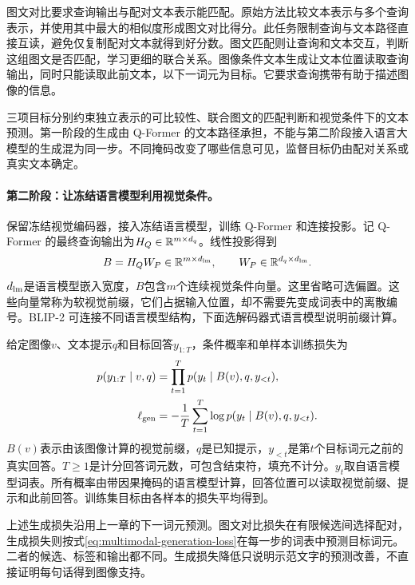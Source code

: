 图文对比要求查询输出与配对文本表示能匹配。原始方法比较文本表示与多个查询表示，并使用其中最大的相似度形成图文对比得分。此任务限制查询与文本路径直接互读，避免仅复制配对文本就得到好分数。图文匹配则让查询和文本交互，判断这组图文是否匹配，学习更细的联合关系。图像条件文本生成让文本位置读取查询输出，同时只能读取此前文本，以下一词元为目标。它要求查询携带有助于描述图像的信息。

三项目标分别约束独立表示的可比较性、联合图文的匹配判断和视觉条件下的文本预测。第一阶段的生成由 Q-Former 的文本路径承担，不能与第二阶段接入语言大模型的生成混为同一步。不同掩码改变了哪些信息可见，监督目标仍由配对关系或真实文本确定。

\paragraph{第二阶段：让冻结语言模型利用视觉条件。}
保留冻结视觉编码器，接入冻结语言模型，训练 Q-Former 和连接投影。记 Q-Former 的最终查询输出为$H_Q\in\mathbb{R}^{m\times d_q}$。线性投影得到
\begin{equation}
 B=H_QW_P\in\mathbb{R}^{m\times d_{\rm lm}},\qquad
 W_P\in\mathbb{R}^{d_q\times d_{\rm lm}}.
 \label{eq:multimodal-blip-prefix}
\end{equation}
$d_{\rm lm}$是语言模型嵌入宽度，$B$包含$m$个连续视觉条件向量。这里省略可选偏置。这些向量常称为软视觉前缀，它们占据输入位置，却不需要先变成词表中的离散编号。BLIP-2 可连接不同语言模型结构，下面选解码器式语言模型说明前缀计算。

给定图像$v$、文本提示$q$和目标回答$y_{1:T}$，条件概率和单样本训练损失为
\begin{align}
 p(y_{1:T}\mid v,q)
 &=\prod_{t=1}^T p(y_t\mid B(v),q,y_{<t}),\\
 \ell_{\rm gen}
 &=-\frac1T\sum_{t=1}^T
 \log p(y_t\mid B(v),q,y_{<t}).
 \label{eq:multimodal-generation-loss}
\end{align}
$B(v)$表示由该图像计算的视觉前缀，$q$是已知提示，$y_{<t}$是第$t$个目标词元之前的真实回答。$T\geq1$是计分回答词元数，可包含结束符，填充不计分。$y_t$取自语言模型词表。所有概率由带因果掩码的语言模型计算，回答位置可以读取视觉前缀、提示和此前回答。训练集目标由各样本的损失平均得到。

上述生成损失沿用上一章的下一词元预测。图文对比损失在有限候选间选择配对，生成损失则按式\eqref{eq:multimodal-generation-loss}在每一步的词表中预测目标词元。二者的候选、标签和输出都不同。生成损失降低只说明示范文字的预测改善，不直接证明每句话得到图像支持。

